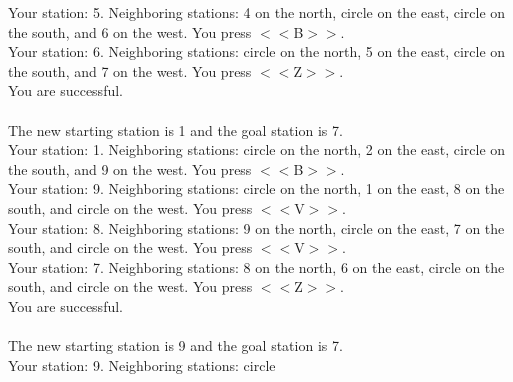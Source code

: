 \documentclass[pdflatex,sn-nature]{sn-jnl}%
\theoremstyle{thmstyleone}%
\theoremstyle{thmstyletwo}%
\theoremstyle{thmstylethree}%
\begin{document}
Your station: 5. Neighboring stations: 4 on the north, circle on the east, circle on the south, and 6 on the west. You press $<<$B$>>$. $~$\\ 
Your station: 6. Neighboring stations: circle on the north, 5 on the east, circle on the south, and 7 on the west. You press $<<$Z$>>$. $~$\\ 
You are successful. $~$\\ 
 $~$\\ 
The new starting station is 1 and the goal station is 7. $~$\\ 
Your station: 1. Neighboring stations: circle on the north, 2 on the east, circle on the south, and 9 on the west. You press $<<$B$>>$. $~$\\ 
Your station: 9. Neighboring stations: circle on the north, 1 on the east, 8 on the south, and circle on the west. You press $<<$V$>>$. $~$\\ 
Your station: 8. Neighboring stations: 9 on the north, circle on the east, 7 on the south, and circle on the west. You press $<<$V$>>$. $~$\\ 
Your station: 7. Neighboring stations: 8 on the north, 6 on the east, circle on the south, and circle on the west. You press $<<$Z$>>$. $~$\\ 
You are successful. $~$\\ 
 $~$\\ 
The new starting station is 9 and the goal station is 7. $~$\\ 
Your station: 9. Neighboring stations: circle  
\end{document}
